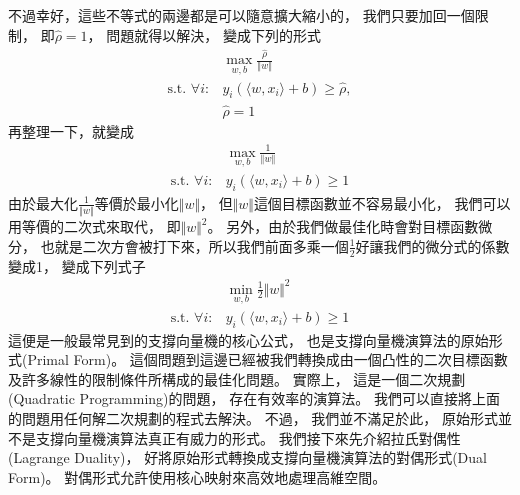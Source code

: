   不過幸好，這些不等式的兩邊都是可以隨意擴大縮小的，    
  我們只要加回一個限制，
  即$\hat{\rho} = 1$，
  問題就得以解決，
  變成下列的形式
  \begin{equation}
    \begin{split}
      &\max_{w, b} \frac{\hat{\rho}}{\Vert w \Vert} \\
      \text{s.t. } \forall i: &y_i ( \langle w, x_i \rangle + b ) \geq \hat{\rho}, \\
      &\hat{\rho} = 1
    \end{split}
  \end{equation}    
  再整理一下，就變成 
  \begin{equation}
    \begin{split}
      &\max_{w, b} \frac{ 1 }{\Vert w \Vert} \\
      \text{s.t. } \forall i: &y_i ( \langle w, x_i \rangle + b ) \geq 1
    \end{split}
  \end{equation}  
  由於最大化$\frac{ 1 }{\Vert w \Vert}$等價於最小化$\Vert w \Vert$，
  但$\Vert w \Vert$這個目標函數並不容易最小化，
  我們可以用等價的二次式來取代，
  即$\Vert w \Vert^2$。
  另外，由於我們做最佳化時會對目標函數微分，
  也就是二次方會被打下來，所以我們前面多乘一個$\frac{1}{2}$好讓我們的微分式的係數變成1，
  變成下列式子
  \begin{equation}
    \begin{split}
      &\min_{w, b} \frac{1}{2} \Vert w \Vert^2  \\
      \text{s.t. } \forall i: &y_i ( \langle w, x_i \rangle + b ) \geq 1
    \end{split}
  \end{equation}   
  這便是一般最常見到的支撐向量機的核心公式，
  也是支撐向量機演算法的原始形式(Primal Form)。
  這個問題到這邊已經被我們轉換成由一個凸性的二次目標函數及許多線性的限制條件所構成的最佳化問題。
  實際上，
  這是一個二次規劃(Quadratic Programming)的問題，
  存在有效率的演算法。
  我們可以直接將上面的問題用任何解二次規劃的程式去解決。  
  不過，
  我們並不滿足於此，
  原始形式並不是支撐向量機演算法真正有威力的形式。
  我們接下來先介紹拉氏對偶性(Lagrange Duality)，
  好將原始形式轉換成支撐向量機演算法的對偶形式(Dual Form)。
  對偶形式允許使用核心映射來高效地處理高維空間。

